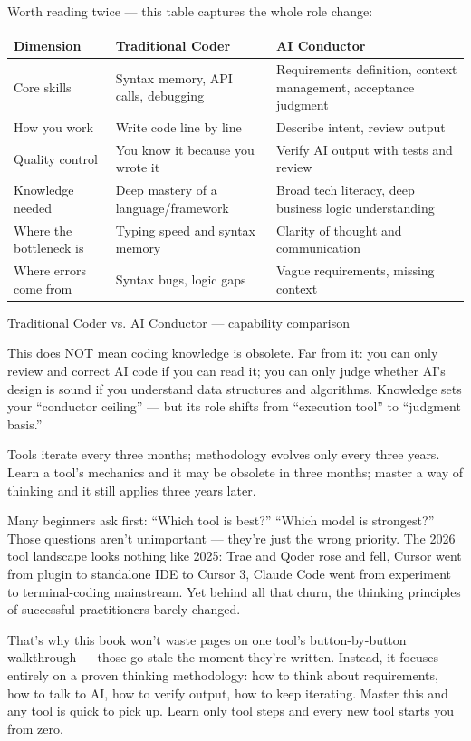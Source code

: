 Worth reading twice — this table captures the whole role change:

\begin{center}
\begin{tabularx}{\linewidth}{|X|X|X|}
\hline
\textbf{Dimension} & \textbf{Traditional Coder} & \textbf{AI Conductor} \tabularnewline
\hline
Core skills & Syntax memory, API calls, debugging & Requirements definition, context management, acceptance judgment \tabularnewline
How you work & Write code line by line & Describe intent, review output \tabularnewline
Quality control & You know it because you wrote it & Verify AI output with tests and review \tabularnewline
Knowledge needed & Deep mastery of a language/framework & Broad tech literacy, deep business logic understanding \tabularnewline
Where the bottleneck is & Typing speed and syntax memory & Clarity of thought and communication \tabularnewline
Where errors come from & Syntax bugs, logic gaps & Vague requirements, missing context \tabularnewline
\hline
\end{tabularx}
\end{center}

\begin{center}\small\color{gray}Traditional Coder vs. AI Conductor — capability comparison\end{center}

This does NOT mean coding knowledge is obsolete. Far from it: you can only review and correct AI code if you can read it; you can only judge whether AI's design is sound if you understand data structures and algorithms. Knowledge sets your “conductor ceiling” — but its role shifts from “execution tool” to “judgment basis.”


Tools iterate every three months; methodology evolves only every three years. Learn a tool's mechanics and it may be obsolete in three months; master a way of thinking and it still applies three years later.

Many beginners ask first: “Which tool is best?” “Which model is strongest?” Those questions aren't unimportant — they're just the wrong priority. The 2026 tool landscape looks nothing like 2025: Trae and Qoder rose and fell, Cursor went from plugin to standalone IDE to Cursor 3, Claude Code went from experiment to terminal-coding mainstream. Yet behind all that churn, the thinking principles of successful practitioners barely changed.

That's why this book won't waste pages on one tool's button-by-button walkthrough — those go stale the moment they're written. Instead, it focuses entirely on a proven thinking methodology: how to think about requirements, how to talk to AI, how to verify output, how to keep iterating. Master this and any tool is quick to pick up. Learn only tool steps and every new tool starts you from zero.

